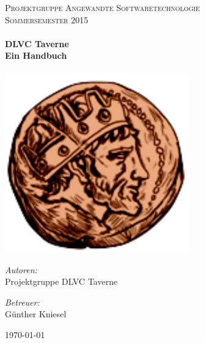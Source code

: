 \begin{titlepage}

\begin{center}



\textsc{\LARGE Projektgruppe Angewandte Softwaretechnologie}\\[1.5cm]

\textsc{\Large Sommersemester 2015}\\[0.5cm]

\HRule \\[0.4cm] { \huge \bfseries DLVC Taverne}\\[0.2cm]
{\large \bfseries Ein Handbuch}\\[0.4cm]

\HRule \\[1.5cm]

\includegraphics[width=0.6\textwidth]{Bilder/Logo3_1.png}\\[1cm]

\begin{minipage}{0.4\textwidth} \begin{flushleft} \large \emph{Autoren:}\\ Projektgruppe DLVC Taverne \end{flushleft} \end{minipage} \hfill \begin{minipage}{0.4\textwidth} \begin{flushright} \large \emph{Betreuer:} \\ Günther Kniesel \end{flushright} \end{minipage}

\vfill

{\large \today}

\end{center}

\end{titlepage}